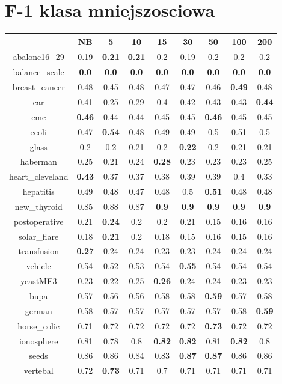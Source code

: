 \documentclass{article}%
\begin{document}
%
\section*{F{-}1 klasa mniejszosciowa}%
\begin{tabular}{c|cccccccc}%
\hline%
&NB&5&10&15&30&50&100&200\\%
\hline%
abalone16\_29&0.19&\textbf{0.21}&\textbf{0.21}&0.2&0.19&0.2&0.2&0.2\\%
\hline%
balance\_scale&\textbf{0.0}&\textbf{0.0}&\textbf{0.0}&\textbf{0.0}&\textbf{0.0}&\textbf{0.0}&\textbf{0.0}&\textbf{0.0}\\%
\hline%
breast\_cancer&0.48&0.45&0.48&0.47&0.47&0.46&\textbf{0.49}&0.48\\%
\hline%
car&0.41&0.25&0.29&0.4&0.42&0.43&0.43&\textbf{0.44}\\%
\hline%
cmc&\textbf{0.46}&0.44&0.44&0.45&0.45&\textbf{0.46}&0.45&0.45\\%
\hline%
ecoli&0.47&\textbf{0.54}&0.48&0.49&0.49&0.5&0.51&0.5\\%
\hline%
glass&0.2&0.2&0.21&0.2&\textbf{0.22}&0.2&0.21&0.21\\%
\hline%
haberman&0.25&0.21&0.24&\textbf{0.28}&0.23&0.23&0.23&0.25\\%
\hline%
heart\_cleveland&\textbf{0.43}&0.37&0.37&0.38&0.39&0.39&0.4&0.33\\%
\hline%
hepatitis&0.49&0.48&0.47&0.48&0.5&\textbf{0.51}&0.48&0.48\\%
\hline%
new\_thyroid&0.85&0.88&0.87&\textbf{0.9}&\textbf{0.9}&\textbf{0.9}&\textbf{0.9}&\textbf{0.9}\\%
\hline%
postoperative&0.21&\textbf{0.24}&0.2&0.2&0.21&0.15&0.16&0.16\\%
\hline%
solar\_flare&0.18&\textbf{0.21}&0.2&0.18&0.15&0.16&0.15&0.16\\%
\hline%
transfusion&\textbf{0.27}&0.24&0.24&0.23&0.23&0.24&0.24&0.24\\%
\hline%
vehicle&0.54&0.52&0.53&0.54&\textbf{0.55}&0.54&0.54&0.54\\%
\hline%
yeastME3&0.23&0.22&0.25&\textbf{0.26}&0.24&0.24&0.23&0.23\\%
\hline%
bupa&0.57&0.56&0.56&0.58&0.58&\textbf{0.59}&0.57&0.58\\%
\hline%
german&0.58&0.57&0.57&0.57&0.57&0.57&0.58&\textbf{0.59}\\%
\hline%
horse\_colic&0.71&0.72&0.72&0.72&0.72&\textbf{0.73}&0.72&0.72\\%
\hline%
ionosphere&0.81&0.78&0.8&\textbf{0.82}&\textbf{0.82}&0.81&\textbf{0.82}&0.8\\%
\hline%
seeds&0.86&0.86&0.84&0.83&\textbf{0.87}&\textbf{0.87}&0.86&0.86\\%
\hline%
vertebal&0.72&\textbf{0.73}&0.71&0.7&0.71&0.71&0.71&0.71\\%
\hline%
\end{tabular}
\end{document}
